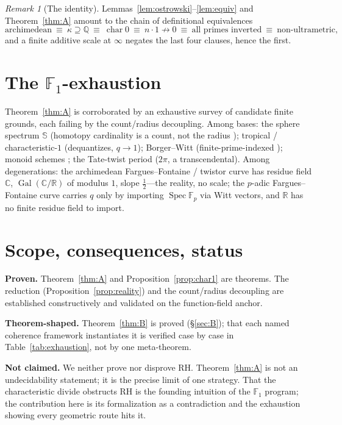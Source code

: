 \documentclass[11pt,reqno]{amsart}
\theoremstyle{plain}
\theoremstyle{definition}
\theoremstyle{remark}
\newtheorem{remark}[theorem]{Remark}
\newcommand{\Q}{\mathbb{Q}}
\newcommand{\R}{\mathbb{R}}
\newcommand{\C}{\mathbb{C}}
\newcommand{\F}{\mathbb{F}}
\newcommand{\Sph}{\mathbb{S}}
\newcommand{\Gal}{\operatorname{Gal}}
\newcommand{\Spec}{\operatorname{Spec}}
\newcommand{\Char}{\operatorname{char}}
\begin{document}
\begin{remark}[The identity]
Lemmas~\ref{lem:ostrowski}--\ref{lem:equiv} and Theorem~\ref{thm:A} amount to the chain of definitional
equivalences
\[
\text{archimedean}\ \equiv\ \kappa\supseteq\Q\ \equiv\ \Char 0\ \equiv\ n\cdot 1\not\to 0\ \equiv\
\text{all primes inverted}\ \equiv\ \text{non-ultrametric},
\]
and a finite additive scale at $\infty$ negates the last four clauses, hence the first.
\end{remark}

\section{The \texorpdfstring{$\F_1$}{F1}-exhaustion}\label{sec:f1}

Theorem~\ref{thm:A} is corroborated by an exhaustive survey of candidate finite grounds, each failing by the
count/radius decoupling. Among bases: the sphere spectrum $\Sph$ (homotopy cardinality is a count, not the
radius \cite{ConnesConsaniRR}); tropical / characteristic-$1$ (dequantizes, $q\to1$); Borger--Witt
(finite-prime-indexed \cite{Borger}); monoid schemes \cite{Deitmar,Soule}; the Tate-twist period ($2\pi$, a
transcendental). Among degenerations: the archimedean Fargues--Fontaine / twistor curve \cite{FarguesFontaine}
has residue field $\C$, $\Gal(\C/\R)$ of modulus $1$, slope $\tfrac12$---the reality, no scale; the $p$-adic
Fargues--Fontaine curve carries $q$ only by importing $\Spec\F_p$ via Witt vectors, and $\R$ has no finite
residue field to import.

\section{Scope, consequences, status}\label{sec:scope}

\noindent\textbf{Proven.} Theorem~\ref{thm:A} and Proposition~\ref{prop:char1} are theorems. The reduction
(Proposition~\ref{prop:reality}) and the count/radius decoupling are established constructively and validated
on the function-field anchor.

\noindent\textbf{Theorem-shaped.} Theorem~\ref{thm:B} is proved (\S\ref{sec:B}); that each named coherence
framework instantiates it is verified case by case in Table~\ref{tab:exhaustion}, not by one meta-theorem.

\noindent\textbf{Not claimed.} We neither prove nor disprove RH. Theorem~\ref{thm:A} is not an undecidability
statement; it is the precise limit of one strategy. That the characteristic divide obstructs RH is the
founding intuition of the $\F_1$ program; the contribution here is its formalization as a contradiction and
the exhaustion showing every geometric route hits it.
\end{document}
